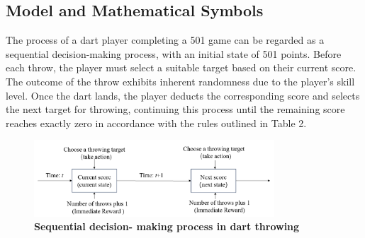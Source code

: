 \documentclass[cjjs]{ipart}
\theoremstyle{plain}
\begin{document}
\begin{table}[h]
    \centering
      \caption{\textbf{The fundamental rules of the 501 dart game.}}
    \label{tab:rules}
\end{table} 



\newpage
\subsection{Model and Mathematical Symbols}
The process of a dart player completing a 501 game can be regarded as a sequential decision-making process, with an initial state of 501 points. Before each throw, the player must select a suitable target based on their current score. The outcome of the throw exhibits inherent randomness due to the player's skill level. Once the dart lands, the player deducts the corresponding score and selects the next target for throwing, continuing this process until the remaining score reaches exactly zero in accordance with the rules outlined in Table 2.

\begin{figure}[h]
    \centering
    \includegraphics[width=0.80\textwidth]{2.png} 
    \caption{\textbf{Sequential decision-
making process in dart throwing}}
    \label{fig:dartboard}
\end{figure}
\end{document}
